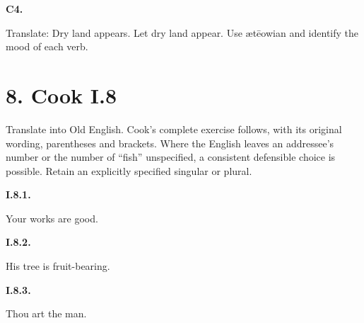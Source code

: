 \par\begin{minipage}{\linewidth}\raggedright
\textbf{C4.}

Translate: Dry land appears. Let dry land appear. Use ætēowian and identify the mood of each verb.

\end{minipage}\par\addvspace{4pt}

\section*{8. Cook I.8}

Translate into Old English. Cook’s complete exercise follows, with its original wording, parentheses and brackets. Where the English leaves an addressee’s number or the number of “fish” unspecified, a consistent defensible choice is possible. Retain an explicitly specified singular or plural.

\par\begin{minipage}{\linewidth}\raggedright
\textbf{I.8.1.}

Your works are good.

\end{minipage}\par\addvspace{4pt}

\par\begin{minipage}{\linewidth}\raggedright
\textbf{I.8.2.}

His tree is fruit-bearing.

\end{minipage}\par\addvspace{4pt}

\par\begin{minipage}{\linewidth}\raggedright
\textbf{I.8.3.}

Thou art the man.

\end{minipage}\par\addvspace{4pt}

